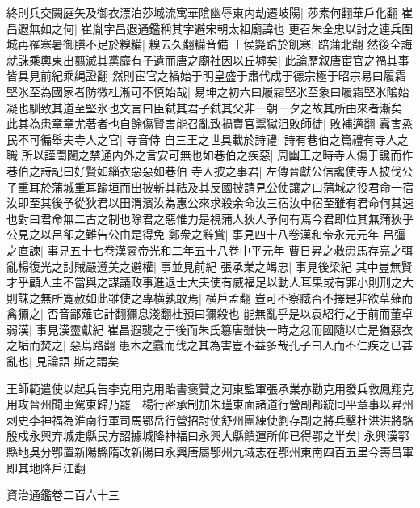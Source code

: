 終則兵交闕庭矢及御衣漂泊莎城流寓華隂幽辱東内劫遷岐陽|{
	莎素何翻華戶化翻}
崔昌遐無如之何|{
	崔胤字昌遐通鑑稱其字避宋朝太祖廟諱也}
更召朱全忠以討之連兵圍城再罹寒暑御膳不足於糗糒|{
	糗去久翻糒音備}
王侯斃踣於飢寒|{
	踣蒲北翻}
然後全誨就誅乘輿東出翦滅其黨靡有孑遺而唐之廟社因以丘墟矣|{
	此論歷叙唐宦官之禍其事皆具見前紀乘䋲證翻}
然則宦官之禍始于明皇盛于肅代成于德宗極于昭宗易曰履霜堅氷至為國家者防微杜漸可不慎始哉|{
	易坤之初六曰履霜堅氷至象曰履霜堅氷隂始凝也馴致其道至堅氷也文言曰臣弑其君子弑其父非一朝一夕之故其所由來者漸矣}
此其為患章章尤著者也自餘傷賢害能召亂致禍賣官鬻獄沮敗師徒|{
	敗補邁翻}
蠧害烝民不可徧舉夫寺人之官|{
	寺音侍}
自三王之世具載於詩禮|{
	詩有巷伯之篇禮有寺人之職}
所以謹閨闥之禁通内外之言安可無也如巷伯之疾惡|{
	周幽王之時寺人傷于讒而作巷伯之詩記曰好賢如緇衣惡惡如巷伯}
寺人披之事君|{
	左傳晉獻公信讒使寺人披伐公子重耳於蒲城重耳踰垣而出披斬其祛及其反國披請見公使讓之曰蒲城之役君命一宿汝即至其後予從狄君以田渭濱汝為惠公來求殺余命汝三宿汝中宿至雖有君命何其速也對曰君命無二古之制也除君之惡惟力是視蒲人狄人予何有焉今君即位其無蒲狄乎公見之以呂卻之難告公由是得免}
鄭衆之辭賞|{
	事見四十八卷漢和帝永元元年}
呂彊之直諫|{
	事見五十七卷漢靈帝光和二年五十八卷中平元年}
曹日昇之救患馬存亮之弭亂楊復光之討賊嚴遵美之避權|{
	事並見前紀}
張承業之竭忠|{
	事見後梁紀}
其中豈無賢才乎顧人主不當與之謀議政事進退士大夫使有威福足以動人耳果或有罪小則刑之大則誅之無所寛赦如此雖使之專横孰敢焉|{
	横戶孟翻}
豈可不察臧否不擇是非欲草薙而禽獮之|{
	否音鄙薙它計翻獮息淺翻杜預曰獮殺也}
能無亂乎是以袁紹行之于前而董卓弱漢|{
	事見漢靈獻紀}
崔昌遐襲之于後而朱氏簒唐雖快一時之忿而國隨以亡是猶惡衣之垢而焚之|{
	惡烏路翻}
患木之蠧而伐之其為害豈不益多哉孔子曰人而不仁疾之已甚亂也|{
	見論語}
斯之謂矣

王師範遣使以起兵告李克用克用貽書褒贊之河東監軍張承業亦勸克用發兵救鳳翔克用攻晉州聞車駕東歸乃罷　楊行密承制加朱瑾東面諸道行營副都統同平章事以昇州刺史李神福為淮南行軍司馬鄂岳行營招討使舒州團練使劉存副之將兵擊杜洪洪將駱殷戍永興弃城走縣民方詔據城降神福曰永興大縣饋運所仰已得鄂之半矣|{
	永興漢鄂縣地吳分鄂置新陽縣隋改新陽曰永興唐屬鄂州九域志在鄂州東南四百五里今壽昌軍即其地降戶江翻}


資治通鑑卷二百六十三
